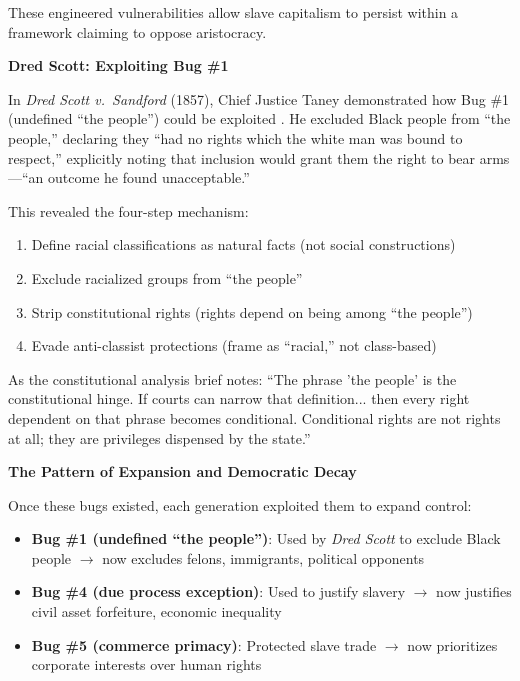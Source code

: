 \documentclass[12pt,openany]{book}
\begin{document}
These engineered vulnerabilities allow slave capitalism to persist within a framework claiming to oppose aristocracy.

\textbf{Dred Scott: Exploiting Bug \#1}

In \textit{Dred Scott v.\ Sandford} (1857), Chief Justice Taney demonstrated how Bug \#1 (undefined ``the people'') could be exploited \cite{dredscott, fehrenbacher}. He excluded Black people from ``the people,'' declaring they ``had no rights which the white man was bound to respect,'' explicitly noting that inclusion would grant them the right to bear arms---``an outcome he found unacceptable.''

This revealed the four-step mechanism:
\begin{enumerate}
    \item Define racial classifications as natural facts (not social constructions)
    \item Exclude racialized groups from ``the people''
    \item Strip constitutional rights (rights depend on being among ``the people'')
    \item Evade anti-classist protections (frame as ``racial,'' not class-based)
\end{enumerate}

As the constitutional analysis brief notes: ``The phrase 'the people' is the constitutional hinge. If courts can narrow that definition... then every right dependent on that phrase becomes conditional. Conditional rights are not rights at all; they are privileges dispensed by the state.''

\textbf{The Pattern of Expansion and Democratic Decay}

Once these bugs existed, each generation exploited them to expand control:

\begin{itemize}
    \item \textbf{Bug \#1 (undefined ``the people'')}: Used by \textit{Dred Scott} to exclude Black people $\rightarrow$ now excludes felons, immigrants, political opponents
    \item \textbf{Bug \#4 (due process exception)}: Used to justify slavery $\rightarrow$ now justifies civil asset forfeiture, economic inequality
    \item \textbf{Bug \#5 (commerce primacy)}: Protected slave trade $\rightarrow$ now prioritizes corporate interests over human rights
\end{itemize}
\end{document}
